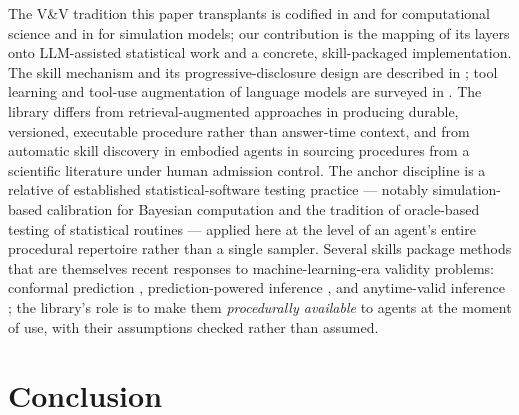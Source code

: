 \documentclass[11pt,a4paper]{article}
\begin{document}
The V\&V tradition this paper transplants is codified in
\citet{roache1998} and \citet{oberkampf2010} for computational science and
in \citet{sargent2013} for simulation models; our contribution is the
mapping of its layers onto LLM-assisted statistical work and a concrete,
skill-packaged implementation. The skill mechanism and its
progressive-disclosure design are described in \citet{anthropic2025skills};
tool learning and tool-use augmentation of language models are surveyed in
\citet{schick2023,mialon2023}. The library differs from
retrieval-augmented approaches \citep{lewis2020} in producing durable,
versioned, executable procedure rather than answer-time context, and from
automatic skill discovery in embodied agents \citep{wang2023voyager} in
sourcing procedures from a scientific literature under human admission
control. The anchor discipline is a relative of established
statistical-software testing practice --- notably simulation-based
calibration for Bayesian computation \citep{talts2018} and the tradition
of oracle-based testing of statistical routines --- applied here at the
level of an agent's entire procedural repertoire rather than a single
sampler. Several skills package methods that are themselves recent
responses to machine-learning-era validity problems: conformal prediction
\citep{vovk2005,angelopoulos2023gentle}, prediction-powered inference
\citep{angelopoulos2023ppi}, and anytime-valid inference
\citep{ramdas2023}; the library's role is to make them \emph{procedurally
available} to agents at the moment of use, with their assumptions checked
rather than assumed.

\section{Conclusion}\label{sec:conclusion}
\end{document}
